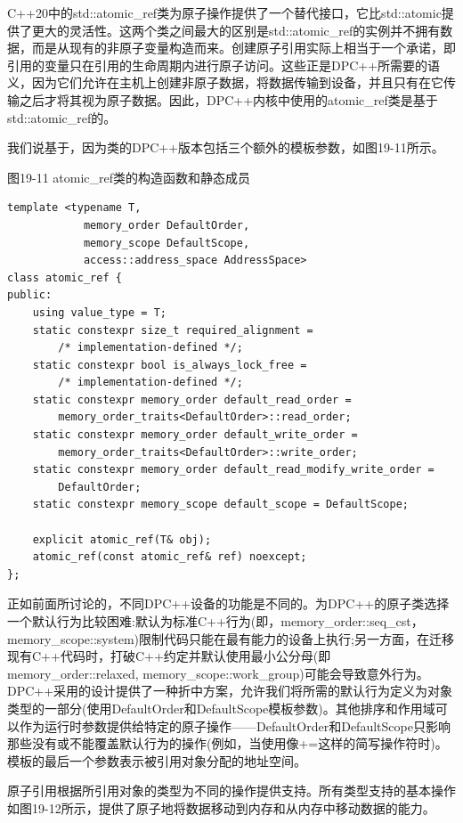 C++20中的std::atomic\_ref类为原子操作提供了一个替代接口，它比std::atomic提供了更大的灵活性。这两个类之间最大的区别是std::atomic\_ref的实例并不拥有数据，而是从现有的非原子变量构造而来。创建原子引用实际上相当于一个承诺，即引用的变量只在引用的生命周期内进行原子访问。这些正是DPC++所需要的语义，因为它们允许在主机上创建非原子数据，将数据传输到设备，并且只有在它传输之后才将其视为原子数据。因此，DPC++内核中使用的atomic\_ref类是基于std::atomic\_ref的。\par

我们说基于，因为类的DPC++版本包括三个额外的模板参数，如图19-11所示。\par

\hspace*{\fill} \par %
图19-11 atomic\_ref类的构造函数和静态成员
\begin{lstlisting}[caption={}]
template <typename T,
			memory_order DefaultOrder,
			memory_scope DefaultScope, 
			access::address_space AddressSpace>
class atomic_ref {
public:
	using value_type = T;
	static constexpr size_t required_alignment =
		/* implementation-defined */;
	static constexpr bool is_always_lock_free =
		/* implementation-defined */;
	static constexpr memory_order default_read_order =
		memory_order_traits<DefaultOrder>::read_order;
	static constexpr memory_order default_write_order =
		memory_order_traits<DefaultOrder>::write_order;
	static constexpr memory_order default_read_modify_write_order =
		DefaultOrder;
	static constexpr memory_scope default_scope = DefaultScope;
	
	explicit atomic_ref(T& obj);
	atomic_ref(const atomic_ref& ref) noexcept;
};
\end{lstlisting}

正如前面所讨论的，不同DPC++设备的功能是不同的。为DPC++的原子类选择一个默认行为比较困难:默认为标准C++行为(即，memory\_order::seq\_cst，memory\_scope::system)限制代码只能在最有能力的设备上执行;另一方面，在迁移现有C++代码时，打破C++约定并默认使用最小公分母(即memory\_order::relaxed, memory\_scope::work\_group)可能会导致意外行为。DPC++采用的设计提供了一种折中方案，允许我们将所需的默认行为定义为对象类型的一部分(使用DefaultOrder和DefaultScope模板参数)。其他排序和作用域可以作为运行时参数提供给特定的原子操作——DefaultOrder和DefaultScope只影响那些没有或不能覆盖默认行为的操作(例如，当使用像+=这样的简写操作符时)。模板的最后一个参数表示被引用对象分配的地址空间。\par

原子引用根据所引用对象的类型为不同的操作提供支持。所有类型支持的基本操作如图19-12所示，提供了原子地将数据移动到内存和从内存中移动数据的能力。\par

